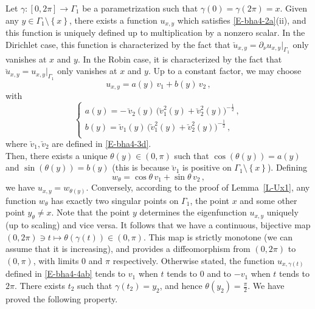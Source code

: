 \documentclass[12pt,a4paper]{amsart}
\theoremstyle{plain} %
\theoremstyle{definition}
\numberwithin{equation}{section}
\numberwithin{figure}{section}
\numberwithin{table}{section}
\newcommand{\sm}{\!\setminus\!}
\newcommand{\set}[1]{\left\lbrace #1 \right\rbrace}
\begin{document}
{Let $\gamma : [0,2\pi] \to \Gamma_1$ be a parametrization such that $\gamma(0)=\gamma(2\pi) = x$.  Given any $y\in \Gamma_1 \sm \set{x}$, there exists a function $u_{x,y}$ which satisfies \eqref{E-bha4-2a}(ii), and this function is uniquely defined up to multiplication by a nonzero scalar. In the Dirichlet case, this function is characterized by the fact that $\breve{u}_{x,y} = \partial_{\nu}u_{x,y}|_{\Gamma_1}$ only vanishes at $x$ and $y$. In the Robin case, it is characterized by the fact that $\breve{u}_{x,y} =u_{x,y}|_{\Gamma_1}$ only vanishes at $x$ and $y$. Up to a constant factor, we may choose
%
\begin{equation}\label{E-bha4-4ab}
u_{x,y} = a(y) \, v_1 + b(y) \, v_2 \,,
\end{equation}
%
with
%
\begin{equation}\label{E-bha4-4c}
\left\{
\begin{array}{l}
a(y) = -\, \breve{v}_2(y)\, \big( \breve{v}_1^2(y) + \breve{v}_2^2(y) \big)^{- \frac 12} \,,\\[5pt]
b(y) = \breve{v}_1(y) \, \big( \breve{v}_1^2(y) + \breve{v}_2^2(y) \big)^{- \frac 12}\,,\\[5pt]
\end{array}
\right.
\end{equation}
%
where $\breve{v}_1, \breve{v}_2$ are defined in \eqref{E-bha4-3d}. \\
Then, there exists a unique $\theta(y) \in (0,\pi)$ such that $\cos(\theta(y)) = a(y)$ and $\sin(\theta(y)) = b(y)$ (this is because $\breve{v}_1$ is positive on $\Gamma_1 \sm \set{x}$). Defining
%
\begin{equation}\label{E-bha4-4d}
w_{\theta} = \cos\theta \, v_1 + \sin\theta \, v_2\,,
\end{equation}
%
we have $u_{x,y} = w_{\theta(y)}$. Conversely, according to the proof of Lemma~\ref{L-Ux1}, any function $w_{\theta}$ has exactly two singular points on $\Gamma_1$, the point $x$ and some other point $y_{\theta} \not = x$. Note that the point $y$ determines the eigenfunction $u_{x,y}$ uniquely (up to scaling) and vice versa. It follows that we have a continuous, bijective map $(0,2\pi) \ni t \mapsto \theta(\gamma(t)) \in (0,\pi)$. This map is strictly monotone (we can assume that it is increasing), and provides a diffeomorphism from $(0,2\pi)$ to $(0,\pi)$, with limits $0$ and $\pi$ respectively. Otherwise stated, the function $u_{x,\gamma(t)}$ defined in \eqref{E-bha4-4ab} tends to $v_1$ when $t$ tends to $0$ and to $-v_1$ when $t$ tends to $2\pi$. There exists $t_2$ such that $\gamma(t_2) = y_2$, and hence $\theta(y_2) = \frac \pi 2$.  We have proved the following property.

}
\end{document}
